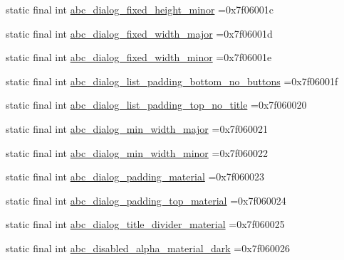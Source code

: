 \begin{DoxyCompactItemize}
\item 
static final int \mbox{\hyperlink{classbr_1_1unb_1_1cic_1_1mp_1_1marketmaster_1_1test_1_1R_1_1dimen_a308b836d0034c775f4f5f738a3868182}{abc\+\_\+dialog\+\_\+fixed\+\_\+height\+\_\+minor}} =0x7f06001c
\item 
static final int \mbox{\hyperlink{classbr_1_1unb_1_1cic_1_1mp_1_1marketmaster_1_1test_1_1R_1_1dimen_a1c4ef0fbe58fdced62e0c6f5f6d38a8e}{abc\+\_\+dialog\+\_\+fixed\+\_\+width\+\_\+major}} =0x7f06001d
\item 
static final int \mbox{\hyperlink{classbr_1_1unb_1_1cic_1_1mp_1_1marketmaster_1_1test_1_1R_1_1dimen_afeecb32ada9927168530f48529eb0ac4}{abc\+\_\+dialog\+\_\+fixed\+\_\+width\+\_\+minor}} =0x7f06001e
\item 
static final int \mbox{\hyperlink{classbr_1_1unb_1_1cic_1_1mp_1_1marketmaster_1_1test_1_1R_1_1dimen_ab17184889bd5db155e01cca50d3eea01}{abc\+\_\+dialog\+\_\+list\+\_\+padding\+\_\+bottom\+\_\+no\+\_\+buttons}} =0x7f06001f
\item 
static final int \mbox{\hyperlink{classbr_1_1unb_1_1cic_1_1mp_1_1marketmaster_1_1test_1_1R_1_1dimen_a2e233e2b74b9556b724d9093ecfcac81}{abc\+\_\+dialog\+\_\+list\+\_\+padding\+\_\+top\+\_\+no\+\_\+title}} =0x7f060020
\item 
static final int \mbox{\hyperlink{classbr_1_1unb_1_1cic_1_1mp_1_1marketmaster_1_1test_1_1R_1_1dimen_a1d23efa40295e99b3c35e8a3d8c646c3}{abc\+\_\+dialog\+\_\+min\+\_\+width\+\_\+major}} =0x7f060021
\item 
static final int \mbox{\hyperlink{classbr_1_1unb_1_1cic_1_1mp_1_1marketmaster_1_1test_1_1R_1_1dimen_a587d132b3954cd2dc8038bb6da965238}{abc\+\_\+dialog\+\_\+min\+\_\+width\+\_\+minor}} =0x7f060022
\item 
static final int \mbox{\hyperlink{classbr_1_1unb_1_1cic_1_1mp_1_1marketmaster_1_1test_1_1R_1_1dimen_adc04c95f1c078283143b7bd1c89082b5}{abc\+\_\+dialog\+\_\+padding\+\_\+material}} =0x7f060023
\item 
static final int \mbox{\hyperlink{classbr_1_1unb_1_1cic_1_1mp_1_1marketmaster_1_1test_1_1R_1_1dimen_acb2a8e19e8c3a81f8b20e458011acde8}{abc\+\_\+dialog\+\_\+padding\+\_\+top\+\_\+material}} =0x7f060024
\item 
static final int \mbox{\hyperlink{classbr_1_1unb_1_1cic_1_1mp_1_1marketmaster_1_1test_1_1R_1_1dimen_a8bca5e54808d8f11b2425017425e8eb7}{abc\+\_\+dialog\+\_\+title\+\_\+divider\+\_\+material}} =0x7f060025
\item 
static final int \mbox{\hyperlink{classbr_1_1unb_1_1cic_1_1mp_1_1marketmaster_1_1test_1_1R_1_1dimen_a35849aed3339d9036d12d62266d7945b}{abc\+\_\+disabled\+\_\+alpha\+\_\+material\+\_\+dark}} =0x7f060026

\end{DoxyCompactItemize}
